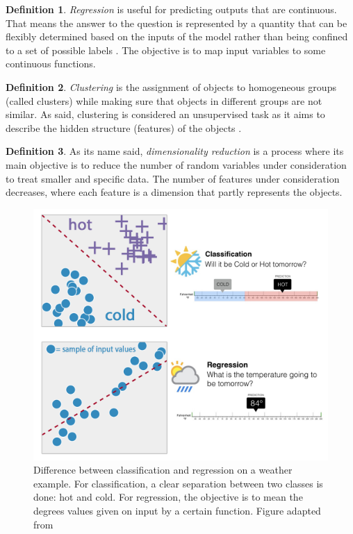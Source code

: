 \documentclass[11pt, openany]{report}
\theoremstyle{plain}
\theoremstyle{definition}
\newtheorem{defn}{Definition}[section]
\theoremstyle{remark}
\begin{document}
\begin{defn}
\textit{Regression} is useful for predicting outputs that are continuous. That means the answer to the question is represented by a quantity that can be flexibly determined based on the inputs of the model rather than being confined to a set of possible labels \cite{class-regression-1}. The objective is to map input variables to some continuous functions. 
\end{defn}

\begin{defn}
\textit{Clustering} is the assignment of objects to homogeneous groups (called clusters) while making sure that objects in different groups are not similar. As said, clustering is considered an unsupervised task as it aims to describe the hidden structure (features) of the objects \cite{clustering-dimensionalityReduction-1}  . 
\end{defn}

\begin{defn}
As its name said, \textit{dimensionality reduction} is a process where its main objective is to reduce the number of random variables under consideration to treat smaller and specific data. The number of features under consideration decreases, where each feature is a dimension that partly represents the objects.
\end{defn}

\begin{figure}[h]
  \centering
  \includegraphics[scale=0.8]{figures/classification-regression.png}
  \caption{Difference between classification and regression on a weather example. For classification, a clear separation between two classes is done: hot and cold. For regression, the objective is to mean the degrees values given on input by a certain function. Figure adapted from \cite{fig_class_regression}}
  \label{fig:classification-regression}
\end{figure}
\end{document}
